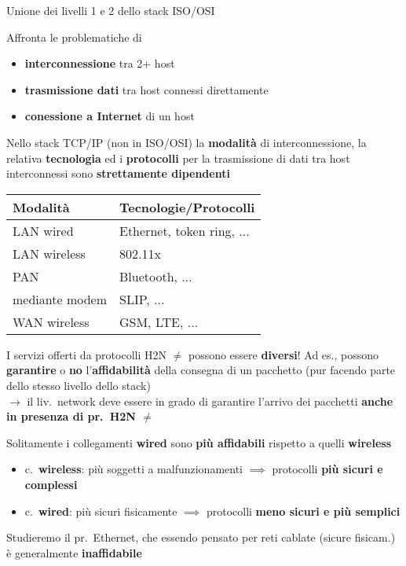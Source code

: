 \noindent\begin{minipage}[c]{.55\textwidth}
Unione dei livelli 1 e 2 dello stack ISO/OSI

Affronta le problematiche di
\begin{itemize}
  \item \textbf{interconnessione} tra 2+ host
  \item \textbf{trasmissione dati} tra host connessi direttamente
  \item \textbf{conessione a Internet} di un host
\end{itemize}
Nello stack TCP/IP (non in ISO/OSI) la \textbf{modalit\`a} di interconnessione, la relativa \textbf{tecnologia} ed i \textbf{protocolli} per la trasmissione di dati tra host interconnessi sono \textbf{strettamente dipendenti}
\end{minipage}\hfill
\begin{minipage}[c]{.4\textwidth}
  \begin{tabular}{| p{} | p{} |}
    \hline
    \cellcolor{gray!20} Modalit\`a & \cellcolor{gray!20} Tecnologie/Protocolli \\
    \hline
    \hline
    LAN wired & Ethernet, token ring, ... \\
    LAN wireless & 802.11x \\
    PAN & Bluetooth, ... \\
    mediante modem & SLIP, ... \\
    WAN wireless & GSM, LTE, ... \\
    \hline
  \end{tabular}
\end{minipage}

\begin{emphasize}[frametitle={Premessa}]
    I servizi offerti da protocolli H2N $\neq$ possono essere \textbf{diversi}! Ad es., possono \textbf{garantire} o \textbf{no} l'\textbf{affidabilit\`a} della consegna di un pacchetto (pur facendo parte dello stesso livello dello stack)\\
    $\rightarrow$ il liv.~network deve essere in grado di garantire l'arrivo dei pacchetti \textbf{anche in presenza di pr.~H2N $\neq$}
\end{emphasize}
\begin{emphasize-blue}[frametitle={Osservazione}]
   Solitamente i collegamenti \textbf{wired} sono \textbf{pi\`u affidabili} rispetto a quelli \textbf{wireless}
   \begin{itemize}
     \item c.~\textbf{wireless}: pi\`u soggetti a malfunzionamenti $\implies$ protocolli \textbf{pi\`u sicuri e complessi}
     \item c.~\textbf{wired}: pi\`u sicuri fisicamente $\implies$ protocolli \textbf{meno sicuri e pi\`u semplici}
   \end{itemize}
   Studieremo il pr.~Ethernet, che essendo pensato per reti cablate (sicure fisicam.) \`e generalmente \textbf{inaffidabile}
\end{emphasize-blue}

